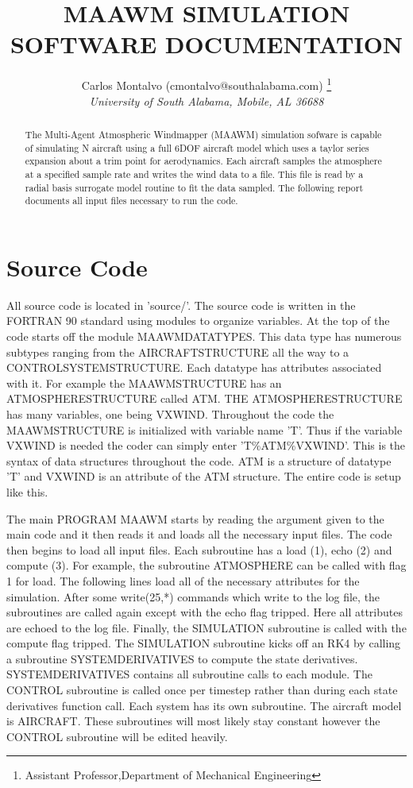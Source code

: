 \documentclass[letterpaper]{article}
\title{\bf MAAWM SIMULATION SOFTWARE DOCUMENTATION}
\author{
  Carlos Montalvo (cmontalvo@southalabama.com) \thanks{Assistant
    Professor,Department of Mechanical Engineering} \\
{\normalsize\itshape
    University of South Alabama, Mobile, AL 36688}\\}
\date{}
\begin{document}
\maketitle
\begin{abstract}

The Multi-Agent Atmospheric Windmapper (MAAWM) simulation sofware is
capable of simulating N aircraft using a full 6DOF aircraft model
which uses a taylor series expansion about a trim point for
aerodynamics. Each aircraft samples the atmosphere at a specified
sample rate and writes the wind data to a file. This file is read by a
radial basis surrogate model routine to fit the data sampled. The
following report documents all input files necessary 
to run the code.

\end{abstract}

\newpage

\tableofcontents

\newpage

\section{Source Code}

All source code is located in 'source/'. The source
code is written in the FORTRAN 90 standard using modules to organize
variables. At the top of the code starts off the module
MAAWMDATATYPES. This data type has numerous subtypes ranging from the
AIRCRAFTSTRUCTURE all the way to a CONTROLSYSTEMSTRUCTURE. Each datatype
has attributes associated with it. For example the MAAWMSTRUCTURE has
an ATMOSPHERESTRUCTURE called ATM. THE ATMOSPHERESTRUCTURE
has many variables, one being VXWIND. Throughout the code
the MAAWMSTRUCTURE is initialized with variable name 'T'. Thus if the
variable VXWIND is needed the coder can 
simply enter 'T\%ATM\%VXWIND'. This is the syntax of data structures
throughout the code. ATM is a structure of datatype 'T' and VXWIND is
an attribute of the ATM structure. The entire code is setup like
this. 

The main PROGRAM MAAWM starts by reading the argument given
to the main code and it then reads it and loads all the necessary
input files. The code then begins to load all input
files. Each subroutine has a load (1), echo (2) and compute (3). For
example, the subroutine ATMOSPHERE can be called with flag 1
for load. The following lines load all of the necessary attributes for
the simulation. After some write(25,*) commands which write to the log
file, the subroutines are called again except with the echo flag
tripped. Here all attributes are echoed to the log
file. Finally, the SIMULATION subroutine is called with the
compute flag tripped. The SIMULATION subroutine kicks off an RK4 by
calling a subroutine SYSTEMDERIVATIVES to compute the state
derivatives. SYSTEMDERIVATIVES contains all subroutine calls to each
module. The CONTROL subroutine is called once per timestep rather than
during each state derivatives function call. Each system has its own
subroutine. The aircraft model is AIRCRAFT. These subroutines will
most likely stay constant however the 
CONTROL subroutine will be edited heavily. 
\end{document}
